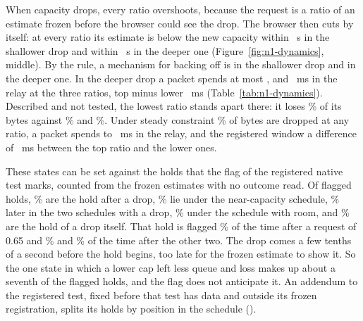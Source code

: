 When capacity drops, every ratio overshoots, because the request is a ratio of an estimate frozen before the browser could see the drop. The browser then cuts by itself: at every ratio its estimate is below the new capacity within \NOneDynShallowBelow{}~s in the shallower drop and within \NOneDynDeepBelow{}~s in the deeper one (Figure~\ref{fig:n1-dynamics}, middle). By the rule, a mechanism for backing off is \NOneDynShallowMechanism{} in the shallower drop and \NOneDynDeepMechanism{} in the deeper one. In the deeper drop a packet spends at most \NOneDynDeepPeakLow{}, \NOneDynDeepPeakMid{} and \NOneDynDeepPeakTop{}~ms in the relay at the three ratios, top minus lower \NOneDynDeepPeakDiff{}~ms \NOneDynDeepPeakDiffT{} (Table~\ref{tab:n1-dynamics}). Described and not tested, the lowest ratio stands apart there: it loses \NOneDynDeepLossLow\% of its bytes against \NOneDynDeepLossMid\% and \NOneDynDeepLossTop\%. Under steady constraint \NOneDynSteadyLoss\% of bytes are dropped at any ratio, a packet spends \NOneDynSteadySojournLow{} to \NOneDynSteadySojournTop{}~ms in the relay, and the registered window \NOneDynSteadyWindow{} a difference of \NOneDynSteadyDiff{}~ms \NOneDynSteadyDiffT{} between the top ratio and the lower ones.

\ifdefined\NOneDynFlagged
These states can be set against the holds that the flag of the registered native test marks, counted from the frozen estimates with no outcome read. Of \NOneDynFlagged{} flagged holds, \NOneDynFlagAfter\% are the hold after a drop, \NOneDynFlagNear\% lie under the near-capacity schedule, \NOneDynFlagLate\% later in the two schedules with a drop, \NOneDynFlagRoom\% under the schedule with room, and \NOneDynFlagDrop\% are the hold of a drop itself. That hold is flagged \NOneDynFlagDropAfterLow\% of the time after a request of 0.65 and \NOneDynFlagDropAfterMid\% and \NOneDynFlagDropAfterTop\% of the time after the other two. The drop comes a few tenths of a second before the hold begins, too late for the frozen estimate to show it. So the one state in which a lower cap left less queue and loss makes up about a seventh of the flagged holds, and the flag does not anticipate it. An addendum to the registered test, fixed before that test has data and outside its frozen registration, splits its holds by position in the schedule ().
\fi

